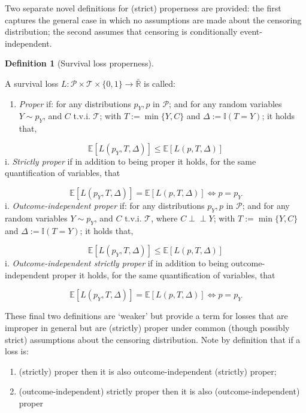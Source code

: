 \documentclass[
  letterpaper,
]{scrbook}
\providecommand{\tightlist}{%
  \setlength{\itemsep}{0pt}\setlength{\parskip}{0pt}}\usepackage{longtable,booktabs,array}
\theoremstyle{plain}
\theoremstyle{definition}
\newtheorem{definition}{Definition}[chapter]
\theoremstyle{remark}
\begin{document}
Two separate novel definitions for (strict) properness are provided: the
first captures the general case in which no assumptions are made about
the censoring distribution; the second assumes that censoring is
conditionally event-independent.

\leavevmode{}%
\begin{definition}[Survival loss properness]\label{def-surv-proper}

A survival loss
\(L: \mathcal{P}\times \mathcal{T}\times \{0,1\}\rightarrow \bar{\mathbb{R}}\)
is called:

\begin{enumerate}
\def\labelenumi{\roman{enumi}.}
\tightlist
\item
  \emph{Proper} if: for any distributions \(p_Y, p\) in \(\mathcal{P}\);
  and for any random variables \(Y \sim p_Y\), and \(C\) t.v.i.
  \(\mathcal{T}\); with \(T := \min\{Y,C\}\) and
  \(\Delta := \mathbb{I}(T=Y)\); it holds that,
\end{enumerate}

\[
\mathbb{E}[L(p_Y, T, \Delta)] \leq \mathbb{E}[L(p, T, \Delta)]
\] i. \emph{Strictly proper} if in addition to being proper it holds,
for the same quantification of variables, that

\[
\mathbb{E}[L(p_Y, T, \Delta)] = \mathbb{E}[L(p, T, \Delta)] \Leftrightarrow p = p_Y
\] i. \emph{Outcome-independent proper} if: for any distributions
\(p_Y, p\) in \(\mathcal{P}\); and for any random variables
\(Y \sim p_Y\), and \(C\) t.v.i. \(\mathcal{T}\), where
\(C \perp \!\!\! \perp Y\); with \(T := \min\{Y,C\}\) and
\(\Delta := \mathbb{I}(T=Y)\); it holds that,

\[
\mathbb{E}[L(p_Y, T, \Delta)] \leq \mathbb{E}[L(p, T, \Delta)]
\] i. \emph{Outcome-independent strictly proper} if in addition to being
outcome-independent proper it holds, for the same quantification of
variables, that

\[
\mathbb{E}[L(p_Y, T, \Delta)] = \mathbb{E}[L(p, T, \Delta)] \Leftrightarrow p = p_Y
\]

\end{definition}

These final two definitions are `weaker' but provide a term for losses
that are improper in general but are (strictly) proper under common
(though possibly strict) assumptions about the censoring distribution.
Note by definition that if a loss is:

\begin{enumerate}
\def\labelenumi{\roman{enumi}.}
\tightlist
\item
  (strictly) proper then it is also outcome-independent (strictly)
  proper;
\item
  (outcome-independent) strictly proper then it is also
  (outcome-independent) proper
\end{enumerate}
\end{document}
